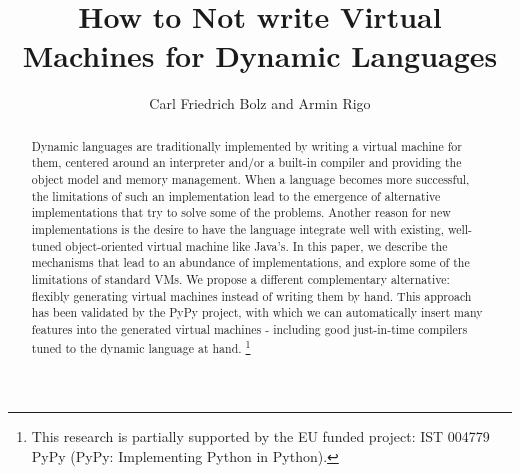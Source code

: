 \documentclass{llncs}
\begin{document}
\pagestyle{headings}

\title{How to Not write Virtual Machines for Dynamic Languages}


\author{Carl Friedrich Bolz and Armin Rigo}




\maketitle

\begin{abstract}

Dynamic languages are traditionally implemented by writing a virtual
machine for them, centered around an interpreter and/or a built-in
compiler and providing the object model and memory management. When
a language becomes more successful, the limitations of such an implementation
lead to the emergence of alternative implementations that try to solve some
of the problems. Another reason for new implementations is the desire to have
the language integrate well with existing, well-tuned object-oriented virtual
machine like Java's. In this paper, we describe the mechanisms that lead to an
abundance of implementations, and explore some of the limitations of standard
VMs.  We propose a different complementary alternative: flexibly generating
virtual machines instead
of writing them by hand.  This approach has been validated by the PyPy
project, with which we can automatically insert many features into the
generated virtual machines - including good just-in-time compilers tuned
to the dynamic language at hand.
\footnote{This research is partially supported by the EU funded %
 project:
IST 004779 PyPy (PyPy: Implementing Python in Python).} \\

\end{abstract}
\end{document}
